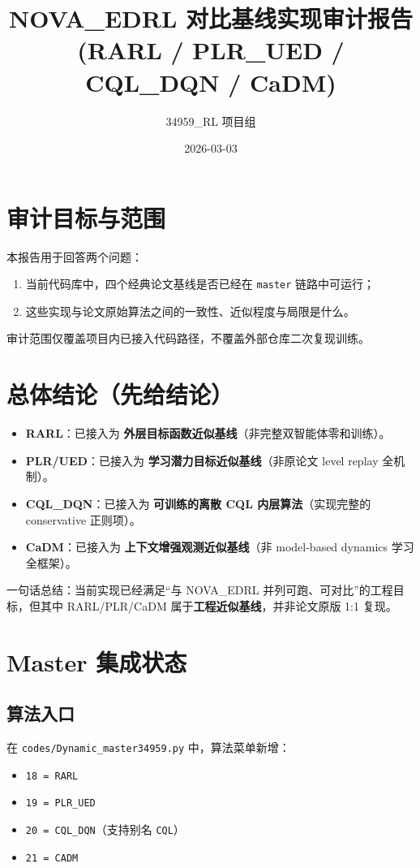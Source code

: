 ﻿\documentclass[12pt,a4paper]{ctexart}
\title{NOVA\_EDRL 对比基线实现审计报告\\(RARL / PLR\_UED / CQL\_DQN / CaDM)}
\author{34959\_RL 项目组}
\date{2026-03-03}
\begin{document}
\maketitle

\section{审计目标与范围}
本报告用于回答两个问题：
\begin{enumerate}
  \item 当前代码库中，四个经典论文基线是否已经在 \texttt{master} 链路中可运行；
  \item 这些实现与论文原始算法之间的一致性、近似程度与局限是什么。
\end{enumerate}

审计范围仅覆盖项目内已接入代码路径，不覆盖外部仓库二次复现训练。

\section{总体结论（先给结论）}
\begin{itemize}
  \item \textbf{RARL}：已接入为 \textbf{外层目标函数近似基线}（非完整双智能体零和训练）。
  \item \textbf{PLR/UED}：已接入为 \textbf{学习潜力目标近似基线}（非原论文 level replay 全机制）。
  \item \textbf{CQL\_DQN}：已接入为 \textbf{可训练的离散 CQL 内层算法}（实现完整的 conservative 正则项）。
  \item \textbf{CaDM}：已接入为 \textbf{上下文增强观测近似基线}（非 model-based dynamics 学习全框架）。
\end{itemize}

一句话总结：当前实现已经满足“与 NOVA\_EDRL 并列可跑、可对比”的工程目标，但其中 RARL/PLR/CaDM 属于\textbf{工程近似基线}，并非论文原版 1:1 复现。

\section{Master 集成状态}
\subsection{算法入口}
在 \texttt{codes/Dynamic\_master34959.py} 中，算法菜单新增：
\begin{itemize}
  \item \texttt{18 = RARL}
  \item \texttt{19 = PLR\_UED}
  \item \texttt{20 = CQL\_DQN}（支持别名 \texttt{CQL}）
  \item \texttt{21 = CADM}
\end{itemize}
\end{document}
